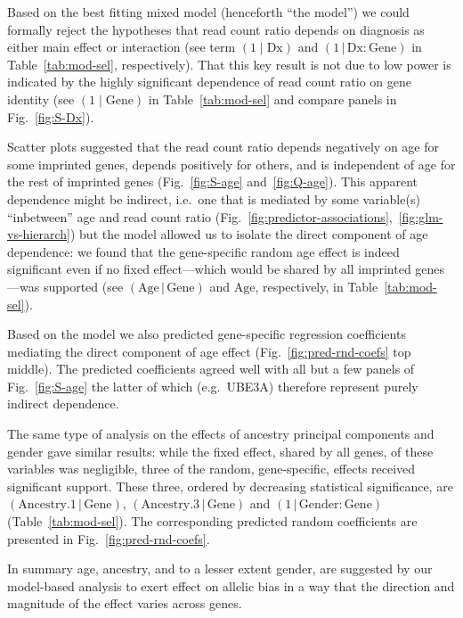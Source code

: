 \documentclass[letterpaper]{article}
\begin{document}
Based on the best fitting mixed model (henceforth ``the model'') we could formally
reject the hypotheses that read count ratio depends on diagnosis as either
main effect or interaction (see term \((1\mid\mathrm{Dx})\) and
\((1\,|\,\mathrm{Dx}:\mathrm{Gene})\) in Table~\ref{tab:mod-sel},
respectively).  That this key result is not due to low power is indicated by
the highly significant dependence of read count ratio on gene identity
(see \((1\mid\mathrm{Gene})\) in Table~\ref{tab:mod-sel} and compare panels in
Fig.~\ref{fig:S-Dx}).

Scatter plots suggested that the read count ratio depends negatively on age
for some imprinted genes, depends positively for others, and is independent of
age for the rest of imprinted genes (Fig.~\ref{fig:S-age}
and~\ref{fig:Q-age}).  This apparent dependence might be indirect, i.e.~one
that is mediated by some variable(s) ``inbetween'' age and read count ratio
(Fig.~\ref{fig:predictor-associations},~\ref{fig:glm-vs-hierarch}) but the
model allowed us to isolate the direct component of age dependence: we found
that the gene-specific random age effect is indeed significant even if no
fixed effect---which would be shared by all imprinted genes---was supported
(see \((\mathrm{Age}\,|\,\mathrm{Gene})\) and \(\mathrm{Age}\), respectively,
in Table~\ref{tab:mod-sel}).

Based on the model we also predicted
gene-specific regression coefficients mediating the direct component of age
effect (Fig.~\ref{fig:pred-rnd-coefs} top middle).  The predicted coefficients
agreed well with all but a few panels of Fig.~\ref{fig:S-age} the latter of
which (e.g.~UBE3A) therefore represent purely indirect dependence.

The same type of analysis on the effects of ancestry principal components and
gender gave similar results: while the fixed effect, shared by all genes, of
these variables was negligible, three of the random, gene-specific, effects
received significant support.  These three, ordered by decreasing
statistical significance, are
\((\mathrm{Ancestry.1}\,|\,\mathrm{Gene})\),
\((\mathrm{Ancestry.3}\,|\,\mathrm{Gene})\) and
\((1\,|\,\mathrm{Gender}:\mathrm{Gene})\) (Table~\ref{tab:mod-sel}).  The
corresponding predicted random coefficients are presented in
Fig.~\ref{fig:pred-rnd-coefs}.

In summary age, ancestry, and to a lesser extent gender, are suggested by our
model-based analysis to exert effect on allelic bias in a way that the
direction and magnitude of the effect varies across genes.
\end{document}
